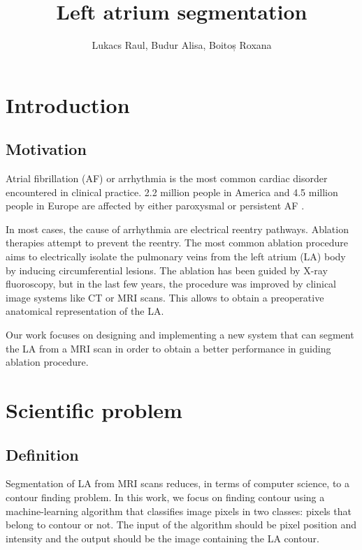 \documentclass[12pt]{report}
\title{\textbf{Left atrium segmentation}}
\author{Lukacs Raul, Budur Alisa, Boitoș Roxana}
\begin{document}
\maketitle
\setlength{\parindent}{1cm}

\begin{abstract}

\end{abstract}
\tableofcontents{}

\chapter{Introduction}
\section{Motivation}
Atrial fibrillation (AF) or arrhythmia is the most common cardiac disorder encountered in clinical practice. 2.2 million people in America and 4.5 million people in Europe are affected by either paroxysmal or persistent AF \cite{sankaranarayanan1}. 

In most cases, the cause of arrhythmia are electrical reentry pathways. Ablation therapies attempt to prevent the reentry. 
The most common ablation procedure aims to electrically isolate the pulmonary veins from the left atrium (LA) body by inducing circumferential lesions. The ablation has been guided by X-ray fluoroscopy, but in the last few years, the procedure was improved by clinical image systems like CT or MRI scans. This allows to obtain a preoperative anatomical representation of the LA.

Our work focuses on designing and implementing a new system that can segment the LA from a MRI scan in order to obtain a better performance in guiding ablation procedure.

\chapter{Scientific problem}
\section{Definition}
Segmentation of LA from MRI scans reduces, in terms of computer science, to a contour finding problem.  In this work, we focus on finding contour using a machine-learning algorithm that classifies image pixels in two classes: pixels that belong to contour or not. The input of the algorithm should be pixel position and intensity and the output should be the image containing the LA contour.
\end{document}
